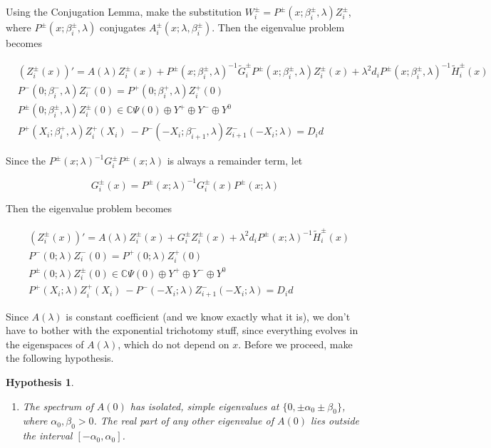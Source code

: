 \documentclass[12pt]{article}
\def\C{{\mathbb C}}
\newtheorem{hypothesis}{Hypothesis}
\begin{document}
Using the Conjugation Lemma, make the substitution $W_i^\pm = P^\pm(x; \beta_i^\pm, \lambda) Z_i^\pm$, where $P^\pm(x; \beta_i^\pm, \lambda)$ conjugates $A_i^\pm(x; \lambda, \beta_i^\pm)$. Then the eigenvalue problem becomes

\begin{align*}
&(Z_i^\pm(x))' = A(\lambda) Z_i^\pm(x) + P^\pm(x; \beta_i^\pm, \lambda)^{-1} \tilde{G}_i^\pm P^\pm(x; \beta_i^\pm, \lambda) Z_i^\pm(x) + \lambda^2 d_i P^\pm(x; \beta_i^\pm, \lambda)^{-1} \tilde{H}_i^\pm(x) \\
&P^-(0; \beta_i^-, \lambda) Z_i^-(0) = P^+(0; \beta_i^+, \lambda) Z_i^+(0) \\
&P^\pm(0; \beta_i^\pm, \lambda) Z_i^\pm(0) \in \C \Psi(0) \oplus Y^+ \oplus Y^- \oplus Y^0 \\
&P^+(X_i; \beta_i^+, \lambda) Z_i^+(X_i)\ - P^-(-X_i; \beta_{i+1}^-, \lambda) Z_{i+1}^-(-X_i; \lambda) = D_i d
\end{align*}

Since the $P^\pm(x; \lambda)^{-1} G_i^\pm P^\pm(x; \lambda)$ is always a remainder term, let

\[
G_i^\pm(x) = P^\pm(x; \lambda)^{-1} G_i^\pm(x) P^\pm(x; \lambda)
\]

Then the eigenvalue problem becomes

\begin{align*}
&(Z_i^\pm(x))' = A(\lambda) Z_i^\pm(x) + G_i^\pm Z_i^\pm(x) + \lambda^2 d_i P^\pm(x; \lambda)^{-1} \tilde{H}_i^\pm(x) \\
&P^-(0; \lambda) Z_i^-(0) = P^+(0; \lambda) Z_i^+(0) \\
&P^\pm(0; \lambda) Z_i^\pm(0) \in \C \Psi(0) \oplus Y^+ \oplus Y^- \oplus Y^0 \\
&P^+(X_i; \lambda) Z_i^+(X_i)\ - P^-(-X_i; \lambda) Z_{i+1}^-(-X_i; \lambda) = D_i d
\end{align*}

Since $A(\lambda)$ is constant coefficient (and we know exactly what it is), we don't have to bother with the exponential trichotomy stuff, since everything evolves in the eigenspaces of $A(\lambda)$, which do not depend on $x$. Before we proceed, make the following hypothesis.

\begin{hypothesis}\label{Aspectrumhyp}
\begin{enumerate}
	\item The spectrum of $A(0)$ has isolated, simple eigenvalues at $\{ 0, \pm \alpha_0 \pm \beta_0 \}$, where $\alpha_0, \beta_0 > 0$. The real part of any other eigenvalue of $A(0)$ lies outside the interval $[-\alpha_0, \alpha_0]$.
\end{enumerate}
\end{hypothesis}
\end{document}
